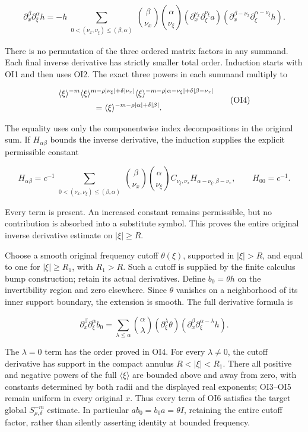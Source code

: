 \documentclass[
  11pt,
]{article}
\begin{document}
\[
\partial_x^\beta\partial_\xi^\alpha h
=-h\!
\sum_{\substack{0<(\nu_x,\nu_\xi)\leq(\beta,\alpha)}}
\binom{\beta}{\nu_x}\binom{\alpha}{\nu_\xi}
(\partial_x^{\nu_x}\partial_\xi^{\nu_\xi}a)
(\partial_x^{\beta-\nu_x}
     \partial_\xi^{\alpha-\nu_\xi}h).
\tag{OI3}
\]

There is no permutation of the three ordered matrix factors in any
summand. Each final inverse derivative has strictly smaller total order.
Induction starts with OI1 and then uses OI2. The exact three powers in
each summand multiply to

\[
\begin{split}
&\langle\xi\rangle^{-m}
\langle\xi\rangle^{m-\rho|\nu_\xi|+\delta|\nu_x|}
\langle\xi\rangle^{-m-\rho|\alpha-\nu_\xi|
                              +\delta|\beta-\nu_x|}\\
&\hspace{15mm}
=\langle\xi\rangle^{-m-\rho|\alpha|+\delta|\beta|}.
\end{split}
\tag{OI4}
\]

The equality uses only the componentwise index decompositions in the
original sum. If \(H_{\alpha\beta}\) bounds the inverse derivative, the
induction supplies the explicit permissible constant

\[
H_{\alpha\beta}
=c^{-1}\!
\sum_{\substack{0<(\nu_x,\nu_\xi)\leq(\beta,\alpha)}}
\binom{\beta}{\nu_x}\binom{\alpha}{\nu_\xi}
C_{\nu_\xi,\nu_x}
H_{\alpha-\nu_\xi,\beta-\nu_x},
\qquad H_{00}=c^{-1}.
\tag{OI5}
\]

Every term is present. An increased constant remains permissible, but no
contribution is absorbed into a substitute symbol. This proves the
entire original inverse derivative estimate on \(|\xi|\geq R\).

Choose a smooth original frequency cutoff \(\theta(\xi)\), supported in
\(|\xi|>R\), and equal to one for \(|\xi|\geq R_1\), with \(R_1>R\).
Such a cutoff is supplied by the finite calculus bump construction;
retain its actual derivatives. Define \(b_0=\theta h\) on the
invertibility region and zero elsewhere. Since \(\theta\) vanishes on a
neighborhood of its inner support boundary, the extension is smooth. The
full derivative formula is

\[
\partial_x^\beta\partial_\xi^\alpha b_0
=\sum_{\lambda\leq\alpha}\binom{\alpha}{\lambda}
(\partial_\xi^\lambda\theta)
(\partial_x^\beta\partial_\xi^{\alpha-\lambda}h).
\tag{OI6}
\]

The \(\lambda=0\) term has the order proved in OI4. For every
\(\lambda\ne0\), the cutoff derivative has support in the compact
annulus \(R<|\xi|<R_1\). There all positive and negative powers of the
full \(\langle\xi\rangle\) are bounded above and away from zero, with
constants determined by both radii and the displayed real exponents;
OI3--OI5 remain uniform in every original \(x\). Thus every term of OI6
satisfies the target global \(S^{-m}_{\rho,\delta}\) estimate. In
particular \(ab_0=b_0a=\theta I\), retaining the entire cutoff factor,
rather than silently asserting identity at bounded frequency.
\end{document}
